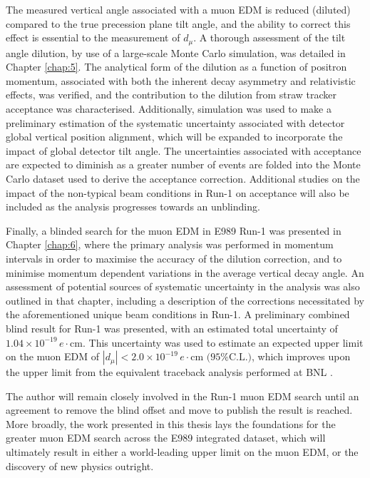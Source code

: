 The measured vertical angle associated with a muon EDM is reduced (diluted) compared to the true precession plane tilt angle, and the ability to correct this effect is essential to the measurement of $d_{\mu}$. A thorough assessment of the tilt angle dilution, by use of a large-scale Monte Carlo simulation, was detailed in Chapter \ref{chap:5}. The analytical form of the dilution as a function of positron momentum, associated with both the inherent decay asymmetry and relativistic effects, was verified, and the contribution to the dilution from straw tracker acceptance was characterised. Additionally, simulation was used to make a preliminary estimation of the systematic uncertainty associated with detector global vertical position alignment, which will be expanded to incorporate the impact of global detector tilt angle. The uncertainties associated with acceptance are expected to diminish as a greater number of events are folded into the Monte Carlo dataset used to derive the acceptance correction. Additional studies on the impact of the non-typical beam conditions in Run-1 on acceptance will also be included as the analysis progresses towards an unblinding.

Finally, a blinded search for the muon EDM in E989 Run-1 was presented in Chapter \ref{chap:6}, where the primary analysis was performed in momentum intervals in order to maximise the accuracy of the dilution correction, and to minimise momentum dependent variations in the average vertical decay angle. An assessment of potential sources of systematic uncertainty in the analysis was also outlined in that chapter, including a description of the corrections necessitated by the aforementioned unique beam conditions in Run-1. A preliminary combined blind result for Run-1 was presented, with an estimated total uncertainty of $1.04\times10^{-19} \,e\cdot\text{cm}$. This uncertainty was used to estimate an expected upper limit on the muon EDM of $  | d_{\mu} | <  2.0\times10^{-19} \,e\cdot\text{cm (95\% C.L.)}$, which improves upon the upper limit from the equivalent traceback analysis performed at BNL \cite{BNLEDM}. 

The author will remain closely involved in the Run-1 muon EDM search until an agreement to remove the blind offset and move to publish the result is reached. More broadly, the work presented in this thesis lays the foundations for the greater muon EDM search across the E989 integrated dataset, which will ultimately result in either a world-leading upper limit on the muon EDM, or the discovery of new physics outright. 
